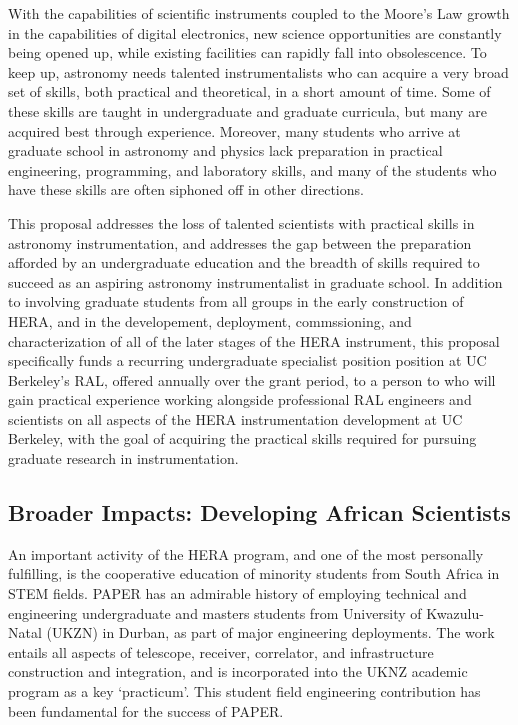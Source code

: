 \documentclass[preprint]{aastex}
\begin{document}
With the capabilities of scientific instruments coupled to the
Moore's Law growth in the capabilities of digital electronics,
new science opportunities are constantly being opened up, while existing
facilities can rapidly fall into obsolescence.  To keep up,
astronomy needs talented instrumentalists who can acquire a very broad
set of skills, both practical and theoretical, in a short amount of time.  
Some of these skills are taught
in undergraduate and graduate
curricula, but many are acquired best through experience.  Moreover,
many students who arrive at graduate school in astronomy and physics
lack preparation in
practical engineering, programming, and laboratory skills, and many of the students
who have these skills 
are often siphoned off in other directions.

This proposal addresses the loss of talented
scientists with practical skills in astronomy
instrumentation, and addresses the gap between the preparation afforded by an
undergraduate education and the breadth of skills required to succeed as an
aspiring astronomy instrumentalist in graduate school.  In addition to involving graduate
students from all groups in the early construction of HERA, and in the developement, deployment,
commssioning, and characterization of all of the later stages of the HERA instrument,
this proposal specifically funds a recurring undergraduate specialist position
position at UC Berkeley's RAL, offered annually over the grant period, to a
person to who will gain practical experience working alongside professional RAL engineers and scientists
on all aspects of the HERA instrumentation development at UC Berkeley, with the goal of
acquiring the practical skills required for
pursuing graduate research in instrumentation.

\vspace{-0.25in}
\subsection{Broader Impacts: Developing African Scientists}

An important activity of the HERA program, and
one of the most personally fulfilling, is the cooperative education of
minority students from South Africa in STEM fields. PAPER has an admirable history
of employing technical and engineering undergraduate and masters
students from 
University of Kwazulu-Natal (UKZN) in Durban, as part of
major engineering deployments. The work entails all
aspects of telescope, receiver, correlator, and infrastructure construction and
integration, and is incorporated into the UKNZ academic
program as a key `practicum'. This
student field engineering contribution has been fundamental for the
success of PAPER.
\end{document}

